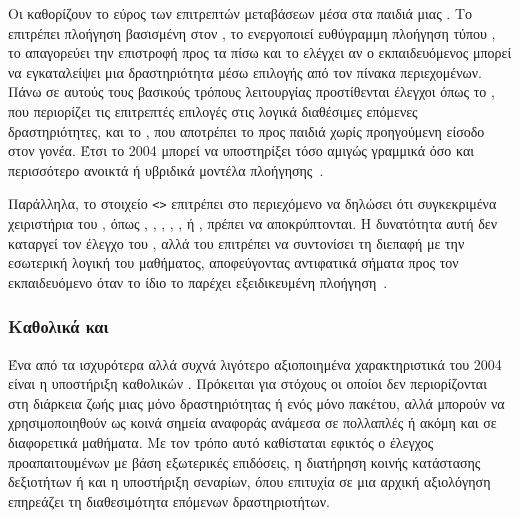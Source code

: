 \begin{table}[htbp]
\centering
\caption{ 2004 }
\label{tab:navigation_events}

\end{table}

Οι  καθορίζουν το εύρος των επιτρεπτών μεταβάσεων μέσα στα παιδιά μιας . Το  επιτρέπει πλοήγηση βασισμένη στον , το  ενεργοποιεί ευθύγραμμη πλοήγηση τύπου , το  απαγορεύει την επιστροφή προς τα πίσω και το  ελέγχει αν ο εκπαιδευόμενος μπορεί να εγκαταλείψει μια δραστηριότητα μέσω επιλογής από τον πίνακα περιεχομένων. Πάνω σε αυτούς τους βασικούς τρόπους λειτουργίας προστίθενται έλεγχοι όπως το , που περιορίζει τις επιτρεπτές επιλογές στις λογικά διαθέσιμες επόμενες δραστηριότητες, και το , που αποτρέπει το  προς παιδιά χωρίς προηγούμενη είσοδο στον γονέα. Έτσι το  2004 μπορεί να υποστηρίξει τόσο αμιγώς γραμμικά όσο και περισσότερο ανοικτά ή υβριδικά μοντέλα πλοήγησης~\cite{ADL_SCORM2004_SN, IMS_SS_ControlModes}.

Παράλληλα, το στοιχείο \texttt{<>} επιτρέπει στο περιεχόμενο να δηλώσει ότι συγκεκριμένα χειριστήρια του , όπως , , , , ,  ή , πρέπει να αποκρύπτονται. Η δυνατότητα αυτή δεν καταργεί τον έλεγχο του , αλλά του επιτρέπει να συντονίσει τη διεπαφή με την εσωτερική λογική του μαθήματος, αποφεύγοντας αντιφατικά σήματα προς τον εκπαιδευόμενο όταν το ίδιο το  παρέχει εξειδικευμένη πλοήγηση~\cite{ADL_SCORM2004_SN, SCORM_Navigation_Guide}.

\subsubsection{Καθολικά  και }

Ένα από τα ισχυρότερα αλλά συχνά λιγότερο αξιοποιημένα χαρακτηριστικά του  2004 είναι η υποστήριξη καθολικών . Πρόκειται για στόχους οι οποίοι δεν περιορίζονται στη διάρκεια ζωής μιας μόνο δραστηριότητας ή ενός μόνο πακέτου, αλλά μπορούν να χρησιμοποιηθούν ως κοινά σημεία αναφοράς ανάμεσα σε πολλαπλές  ή ακόμη και σε διαφορετικά μαθήματα. Με τον τρόπο αυτό καθίσταται εφικτός ο έλεγχος προαπαιτουμένων με βάση εξωτερικές επιδόσεις, η διατήρηση κοινής κατάστασης δεξιοτήτων ή  και η υποστήριξη  σεναρίων, όπου επιτυχία σε μια αρχική αξιολόγηση επηρεάζει τη διαθεσιμότητα επόμενων δραστηριοτήτων.

